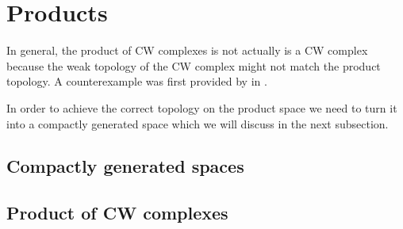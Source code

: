 \section{Products}\label{sec:products}

In general, the product of CW complexes is not actually is a CW complex because the weak topology of the CW complex might not match the product topology. 
A counterexample was first provided by \citeauthor{Dowker1952} in \cite{Dowker1952}.

In order to achieve the correct topology on the product space we need to turn it into a compactly generated space which we will discuss in the next subsection.

\subsection{Compactly generated spaces}


\subsection{Product of CW complexes}

